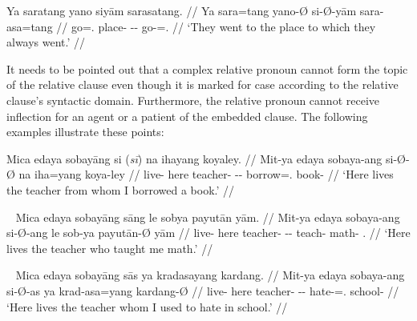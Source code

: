 \a\label{ex:reldat}\begingl
	\gla Ya saratang yano siyām sarasatang. //
	\glb Ya sara=tang yano-Ø si-Ø-yām sara-asa=tang //
	\glc \LocT{} go=\TplM{}.\Aarg{} place-\Top{} \Rel{}-\Loc{}-\Dat{} 
		go-\Hab{}=\TplM{}.\Aarg{} //
	\glft `They went to the place to which they always went.' //
\endgl
\xe

It needs to be pointed out that a complex relative pronoun cannot form the
topic of the relative clause even though it is marked for case according to the
relative clause's syntactic domain. Furthermore, the relative pronoun cannot
receive inflection for an agent or a patient of the embedded clause. The
following examples illustrate these points:

\pex\label{ex:reltop}
\ljudge* \begingl
	\gla Mica edaya sobayāng {si \textup{(\ques{}\textit{sī})}} na ihayang 
		koyaley. //
	\glb Mit-ya edaya sobaya-ang si-Ø-Ø na iha=yang koya-ley //
	\glc live-\TsgM{} here teacher-\Aarg{} \Rel{}-\Aarg{}-\Top{} \GenT{} 
		borrow=\Fsg{}.\Aarg{} book-\PargI{} //
% 
	\glft `Here lives the teacher from whom I borrowed a book.' //
\endgl
\xe

\pex~\label{ex:relagt}
\ljudge* \begingl
	\gla Mica edaya sobayāng sāng le sobya payutān yām. //
	\glb Mit-ya edaya sobaya-ang si-Ø-ang le sob-ya payutān-Ø yām //
	\glc live-\TsgM{} here teacher-\Aarg{} \Rel{}-\Aarg{}-\Aarg{} \PatTI{} 
		teach-\TsgM{} math-\Top{} \Fsg{}.\Dat{} //
% 
	\glft `Here lives the teacher who taught me math.' //
\endgl
\xe

\pex~\label{ex:relpat}
\ljudge* \begingl
	\gla Mica edaya sobayāng sās ya kradasayang kardang. //
	\glb Mit-ya edaya sobaya-ang si-Ø-as ya krad-asa=yang kardang-Ø //
	\glc live-\TsgM{} here teacher-\Aarg{} \Rel{}-\Aarg{}-\Parg{} \LocT{}
		hate-\Hab{}=\Fsg{}.\Aarg{} school-\Top{} //
% 
	\glft `Here lives the teacher whom I used to hate in school.' //
\endgl
\xe

